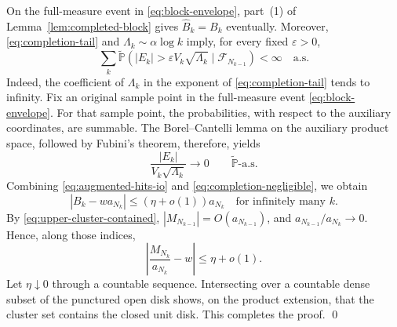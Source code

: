 \documentclass[12pt, reqno, final, a4paper]{amsart}
\theoremstyle{plain}
\theoremstyle{definition}
\theoremstyle{remark}
\newcommand{\1}{\mathbf 1}
\begin{document}
On the full-measure event in \eqref{eq:block-envelope}, part~(1) of
Lemma~\ref{lem:completed-block} gives $\widehat B_k=B_k$ eventually. Moreover,
\eqref{eq:completion-tail} and $\Lambda_k\sim\alpha\log k$ imply, for every
fixed $\varepsilon>0$,
\[
 \sum_k\widetilde{\mathbb P}\left(
 |E_k|>\varepsilon V_k\sqrt{\Lambda_k}
 \mid\mathcal F_{N_{k-1}}\right)<\infty
 \quad\text{a.s.}
\]
Indeed, the coefficient of $\Lambda_k$ in the exponent of
\eqref{eq:completion-tail} tends to infinity. Fix an original sample point in
the full-measure event \eqref{eq:block-envelope}. For that sample point, the
probabilities, with respect to the auxiliary coordinates, are summable.
The Borel--Cantelli lemma on the auxiliary product space, followed by
Fubini's theorem, therefore, yields
\begin{equation}\label{eq:completion-negligible}
 \frac{|E_k|}{V_k\sqrt{\Lambda_k}}\longrightarrow0
 \qquad\widetilde{\mathbb P}\text{-a.s.}
\end{equation}
Combining \eqref{eq:augmented-hits-io} and
\eqref{eq:completion-negligible}, we obtain
\[
 |B_k-w a_{N_k}|\le(\eta+o(1))a_{N_k}
 \quad\text{for infinitely many }k.
\]
By \eqref{eq:upper-cluster-contained},
$|M_{N_{k-1}}|=O(a_{N_{k-1}})$, and
$a_{N_{k-1}}/a_{N_k}\to0$. Hence, along those indices,
\[
 \left|\frac{M_{N_k}}{a_{N_k}}-w\right|\le\eta+o(1).
\]
Let $\eta\downarrow0$ through a countable sequence. Intersecting over a countable dense subset of the punctured open disk shows, on the product extension, that the cluster set contains the closed unit disk. This completes the proof.
\qed
\end{document}
